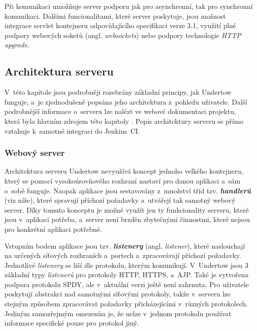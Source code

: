             Při komunikaci umožňuje server podporu jak pro asynchronní, tak
            pro synchronní komunikaci.
            Dalšími funcionalitami, které server poskytuje, jsou možnost integrace
            servlet kontejneru odpovídajícího specifikaci verze 3.1,
            využití plné podpory webových soketů (angl. \emph{websockets}) nebo 
            podpory technologie \emph{HTTP upgrade}.

        \subsection{Architektura serveru}
            V~této kapitole jsou podrobněji rozebrány základní principy, jak Undertow funguje, 
            a~je zjednodušeně popsána jeho architektura z~pohledu uživatele. Další podrobnější informace o~serveru 
            lze nalézt ve webové dokumentaci projektu, která byla hlavním zdrojem této kapitoly \cite{undertowDocs}.
            Popis architektury serveru se přímo vztahuje k~samotné integraci do Jenkins~CI.

            \subsubsection{Webový server}
                Architektura serveru Undertow nevyužívá koncept jednoho velkého kontejneru, který se pomocí vysokoúrovňového rozhraní nastaví 
                pro danou aplikaci a~sám o~sobě funguje. Naopak aplikace jsou sestavovány z~množství tříd tzv. \textbf{\emph{handlerů}}
                (viz níže), které spravují příchozí požadavky a~utvářejí tak samotný webový server. 
                Díky tomuto konceptu je možné využít jen ty funkcionality serveru, které jsou v~aplikaci potřeba, a~server
                není brzděn zbytečnými činnostmi, které nejsou pro konkrétní aplikaci potřebné. 

                Vstupním bodem aplikace jsou tzv. \textbf{\emph{listenery}} (angl. \emph{listener}), které naslouchají na určených síťových
                rozhraních a~portech a~zpracovávají příchozí požadavky. Jednotlivé \emph{listenery} se liší dle protokolu, kterým komunikují.
                V~Undertow jsou 3 základní typy \emph{listenerů}
                pro protokoly HTTP, HTTPS, a~AJP. Také je vytvořena podpora protokolu SPDY, ale v~aktuální verzi ještě není zahrnuta. 
                Pro uživatele poskytují abstrakci nad samotnými síťovými protokoly, takže v~serveru lze stejným způsobem zpracovávat
                požadavky přicházejícími v~různých protokolech. Jediným samozřejmým omezením je, že nelze v~jednom protokolu
                používat informace specifické pouze pro protokol jiný. 
                
